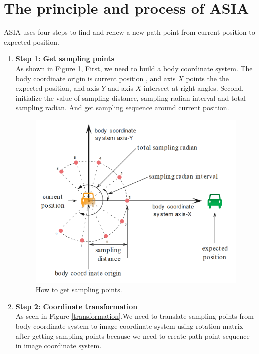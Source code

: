 \section{The principle and process of ASIA}

ASIA uses four steps to find and renew a new path point from current position to expected position.

\begin{enumerate}
    \item \textbf{Step 1: Get sampling points}\\
    As shown in Figure \ref{samplings}, First, we need to build a body coordinate system. The body coordinate origin is current position , and axis $X$ points the the expected position, and axis $Y$ and axis $X$ intersect at right angles. Second, initialize the value of sampling distance, sampling radian interval and total sampling radian. And get sampling sequence around current position.
    
    \begin{figure}[thb]
        \centering
        \includegraphics[width=1\textwidth]{images/PathPlaningSampling.png}
        \caption[How to find the path point]{How to get sampling points.}\label{samplings}
    \end{figure}
    
    \item \textbf{Step 2: Coordinate transformation}\\
    As seen in Figure \ref{transformation},We need to translate sampling points from body coordinate system to image coordinate system using rotation matrix after getting sampling points because we need to create path point sequence in image coordinate system.
    

\end{enumerate}
